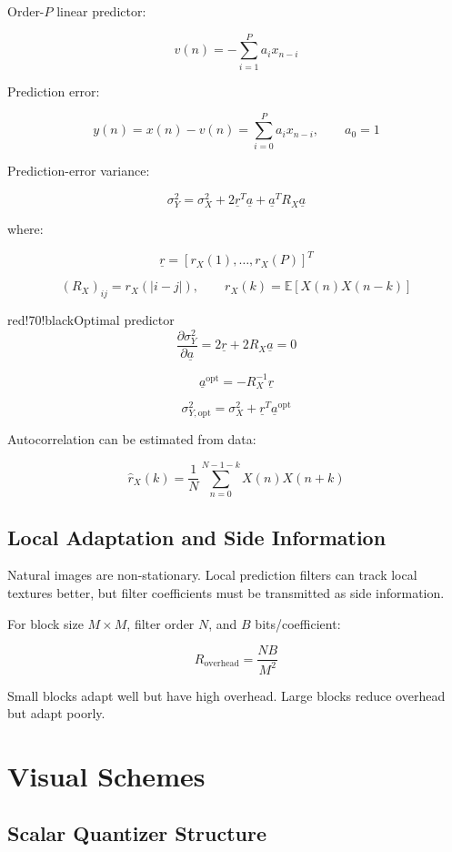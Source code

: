 Order-$P$ linear predictor:

\[
v(n)=-\sum_{i=1}^{P}a_i x_{n-i}
\]

Prediction error:

\[
y(n)=x(n)-v(n)=\sum_{i=0}^{P}a_i x_{n-i}, \qquad a_0=1
\]

Prediction-error variance:

\[
\sigma_Y^2=\sigma_X^2+2\underline{r}^{T}\underline{a}
+\underline{a}^{T}R_X\underline{a}
\]

where:

\[
\underline{r}=[r_X(1),\ldots,r_X(P)]^T
\]

\[
(R_X)_{ij}=r_X(|i-j|), \qquad r_X(k)=\mathbb{E}[X(n)X(n-k)]
\]

\begin{calloutbox}{red!70!black}{Optimal predictor}
\[
\frac{\partial\sigma_Y^2}{\partial\underline{a}}
=2\underline{r}+2R_X\underline{a}=0
\]

\[
\underline{a}^{\mathrm{opt}}=-R_X^{-1}\underline{r}
\]

\[
\sigma_{Y,\mathrm{opt}}^2=\sigma_X^2+\underline{r}^{T}\underline{a}^{\mathrm{opt}}
\]
\end{calloutbox}

Autocorrelation can be estimated from data:

\[
\hat{r}_X(k)=\frac{1}{N}\sum_{n=0}^{N-1-k}X(n)X(n+k)
\]

\subsection{Local Adaptation and Side Information}

Natural images are non-stationary. Local prediction filters can track local textures better, but filter coefficients must be transmitted as side information.

For block size $M\times M$, filter order $N$, and $B$ bits/coefficient:

\[
R_{\text{overhead}}=\frac{NB}{M^2}
\]

Small blocks adapt well but have high overhead. Large blocks reduce overhead but adapt poorly.

\section{Visual Schemes}

\subsection{Scalar Quantizer Structure}

